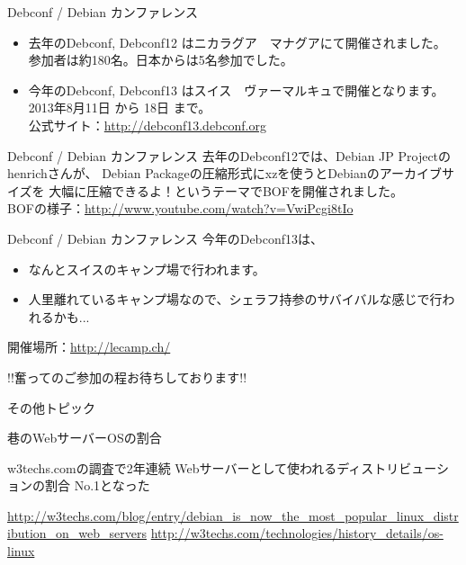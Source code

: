 \begin{frame}{Debconf / Debian カンファレンス}
\begin{itemize}
\item 去年のDebconf, Debconf12 はニカラグア　マナグアにて開催されました。\\
参加者は約180名。日本からは5名参加でした。
\item 今年のDebconf, Debconf13 はスイス　ヴァーマルキュで開催となります。\\
2013年8月11日 から 18日 まで。\\
公式サイト：\url{http://debconf13.debconf.org}
\end{itemize}
\end{frame}

\begin{frame}{Debconf / Debian カンファレンス}
 去年のDebconf12では、Debian JP Projectのhenrichさんが、
Debian Packageの圧縮形式にxzを使うとDebianのアーカイブサイズを
大幅に圧縮できるよ！というテーマでBOFを開催されました。\\
BOFの様子：\url{http://www.youtube.com/watch?v=VwiPcgi8tIo}
\end{frame}

\begin{frame}{Debconf / Debian カンファレンス}
今年のDebconf13は、
\begin{itemize}
\item なんとスイスのキャンプ場で行われます。
\item 人里離れているキャンプ場なので、シェラフ持参のサバイバルな感じで行われるかも...
\end{itemize}
開催場所：\url{http://lecamp.ch/}\\
\begin{center}
\Large
!!奮ってのご参加の程お待ちしております!!
\end{center}
\end{frame}

\begin{frame}
\begin{center}
\LARGE{その他トピック}
\end{center}
\end{frame}

\begin{frame}{巷のWebサーバーOSの割合}
\begin{center}
\Large  w3techs.comの調査で2年連続 Webサーバーとして使われるディストリビューションの割合 No.1となった
\end{center}
\url{http://w3techs.com/blog/entry/debian_is_now_the_most_popular_linux_distribution_on_web_servers}
\url{http://w3techs.com/technologies/history_details/os-linux}
\end{frame}

